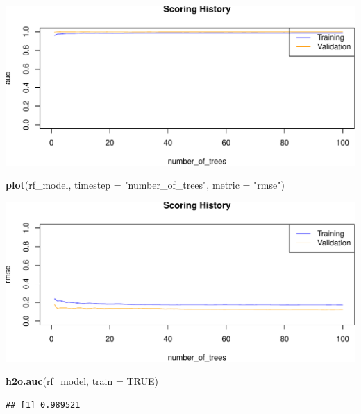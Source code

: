 \documentclass[]{article}
\newenvironment{Shaded}{\begin{snugshade}}{\end{snugshade}}
\newcommand{\KeywordTok}[1]{\textcolor[rgb]{0.13,0.29,0.53}{\textbf{{#1}}}}
\newcommand{\DataTypeTok}[1]{\textcolor[rgb]{0.13,0.29,0.53}{{#1}}}
\newcommand{\StringTok}[1]{\textcolor[rgb]{0.31,0.60,0.02}{{#1}}}
\newcommand{\OtherTok}[1]{\textcolor[rgb]{0.56,0.35,0.01}{{#1}}}
\newcommand{\NormalTok}[1]{{#1}}
\begin{document}
\begin{center}\includegraphics{webinar_code_files/figure-latex/unnamed-chunk-55-1} \end{center}

\begin{Shaded}
\begin{Highlighting}[]
\KeywordTok{plot}\NormalTok{(rf_model,}
     \DataTypeTok{timestep =} \StringTok{"number_of_trees"}\NormalTok{,}
     \DataTypeTok{metric =} \StringTok{"rmse"}\NormalTok{)}
\end{Highlighting}
\end{Shaded}

\begin{center}\includegraphics{webinar_code_files/figure-latex/unnamed-chunk-56-1} \end{center}

\begin{Shaded}
\begin{Highlighting}[]
\KeywordTok{h2o.auc}\NormalTok{(rf_model, }\DataTypeTok{train =} \OtherTok{TRUE}\NormalTok{)}
\end{Highlighting}
\end{Shaded}

\begin{verbatim}
## [1] 0.989521
\end{verbatim}
\end{document}
